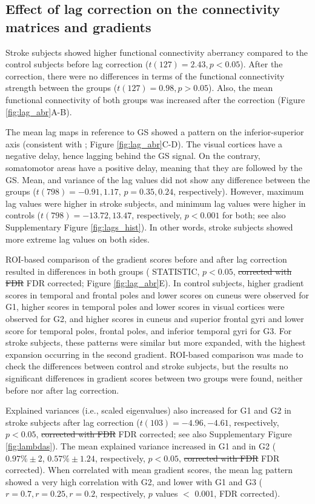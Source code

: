 \documentclass[fleqn,10pt]{wlscirep}
\begin{document}
\subsection*{Effect of lag correction on the connectivity matrices and gradients}

Stroke subjects showed higher functional connectivity aberrancy compared to the control subjects before lag correction ($t(127) = 2.43, p < 0.05$). After the correction, there were no differences in terms of the functional connectivity strength between the groups ($t(127) = 0.98, p > 0.05$). Also, the mean functional connectivity of both groups was increased after the correction (Figure \ref{fig:lag_abr}A-B). 

The mean lag maps in reference to GS showed a pattern on the inferior-superior axis (consistent with \citet{tong2019low,erdougan2016correcting}; Figure \ref{fig:lag_abr}C-D). The visual cortices have a negative delay, hence lagging behind the GS signal. On the contrary, somatomotor areas have a positive delay, meaning that they are followed by the GS. Mean, and variance of the lag values did not show any difference between the groups ($t(798) = -0.91, 1.17$, $p = 0.35, 0.24$, respectively). However, maximum lag values were higher in stroke subjects, and minimum lag values were higher in controls ($t(798) = -13.72, 13.47$, respectively,  $p < 0.001$ for both; see also Supplementary Figure \ref{fig:lags_hist}). In other words, stroke subjects showed more extreme lag values on both sides. 

ROI-based comparison of the gradient scores before and after lag correction resulted in differences in both groups (\color{purple} STATISTIC, \color{black} $p < 0.05$, \color{red} \st{corrected with FDR} \color{blue} FDR corrected\color{black}; Figure \ref{fig:lag_abr}E). In control subjects, higher gradient scores in temporal and frontal poles and lower scores on cuneus were observed for G1, higher scores in temporal poles and lower scores in visual cortices were observed for G2, and higher scores in cuneus and superior frontal gyri and lower score for temporal poles, frontal poles, and inferior temporal gyri for G3. For stroke subjects, these patterns were similar but more expanded, with the highest expansion occurring in the second gradient. ROI-based comparison was made to check the differences between control and stroke subjects, but the results no significant differences in gradient scores between two groups were found, neither before nor after lag correction.

Explained variances (i.e., scaled eigenvalues) also increased for G1 and G2 in stroke subjects after lag correction ($t(103) = -4.96, -4.61$, respectively, $p < 0.05$, \color{red}\st{corrected with FDR}\color{blue} FDR corrected\color{black}; see also Supplementary Figure \ref{fig:lambdas}). The mean explained variance increased in G1 and in G2 ($0.97\% \pm 2$, $0.57\% \pm 1.24$, respectively, $p < 0.05$, \color{red}\st{corrected with FDR}\color{blue} FDR corrected\color{black}). When correlated with mean gradient scores, the mean lag pattern showed a very high correlation with G2, and lower with G1 and G3 \color{blue}($r = 0.7, r = 0.25, r = 0.2$, respectively, $p$ values $<$ 0.001, FDR corrected)\color{black}.
\end{document}
